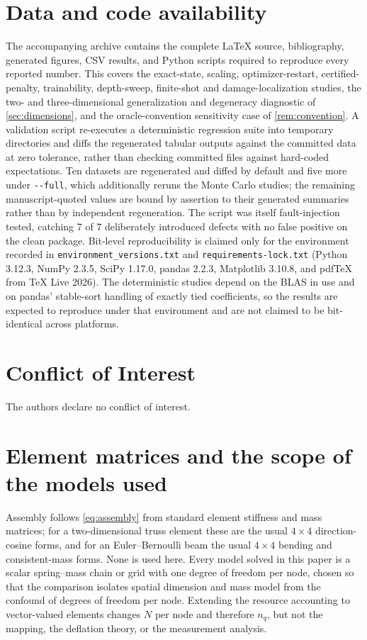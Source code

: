 \documentclass{ieeeaccess}
\begin{document}
\section*{Data and code availability}
The accompanying archive contains the complete LaTeX source, bibliography, generated figures, CSV results, and Python scripts required to reproduce every reported number. This covers the exact-state, scaling, optimizer-restart, certified-penalty, trainability, depth-sweep, finite-shot and damage-localization studies, the two- and three-dimensional generalization and degeneracy diagnostic of \cref{sec:dimensions}, and the oracle-convention sensitivity case of \cref{rem:convention}. A validation script re-executes a deterministic regression suite into temporary directories and diffs the regenerated tabular outputs against the committed data at zero tolerance, rather than checking committed files against hard-coded expectations. Ten datasets are regenerated and diffed by default and five more under \texttt{-{-}full}, which additionally reruns the Monte Carlo studies; the remaining manuscript-quoted values are bound by assertion to their generated summaries rather than by independent regeneration. The script was itself fault-injection tested, catching 7 of 7 deliberately introduced defects with no false positive on the clean package. Bit-level reproducibility is claimed only for the environment recorded in \texttt{environment\_versions.txt} and \texttt{requirements-lock.txt} (Python 3.12.3, NumPy 2.3.5, SciPy 1.17.0, pandas 2.2.3, Matplotlib 3.10.8, and pdf\TeX{} from \TeX{} Live 2026). The deterministic studies depend on the BLAS in use and on pandas' stable-sort handling of exactly tied coefficients, so the results are expected to reproduce under that environment and are not claimed to be bit-identical across platforms.

\section*{Conflict of Interest}
The authors declare no conflict of interest.

\appendices
\section{Element matrices and the scope of the models used}
Assembly follows \cref{eq:assembly} from standard element stiffness and mass matrices; for a two-dimensional truss element these are the usual $4\times4$ direction-cosine forms, and for an Euler--Bernoulli beam the usual $4\times4$ bending and consistent-mass forms. None is used here. Every model solved in this paper is a scalar spring--mass chain or grid with one degree of freedom per node, chosen so that the comparison isolates spatial dimension and mass model from the confound of degrees of freedom per node. Extending the resource accounting to vector-valued elements changes $N$ per node and therefore $n_q$, but not the mapping, the deflation theory, or the measurement analysis.
\end{document}
